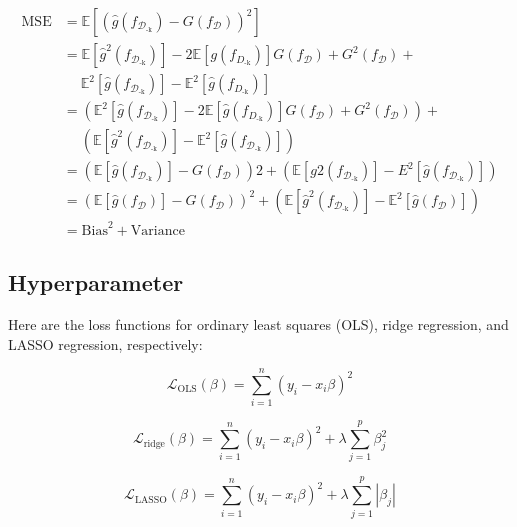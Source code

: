 \begin{equation} \label{eq_mse}
    \begin{split}
        \mathrm{MSE}&=\mathbb{E}[(\hat{g}(f_{\mathcal{D}_{\text{-k}}})-G(f_\mathcal{D}))^2]\\
        &=\mathbb{E}[{\hat{g}}^2(f_{\mathcal{D}_{\text{-k}}})] - 2\mathbb{E}[g(f_{D_\text{-k}})]G(f_\mathcal{D})+G^2(f_\mathcal{D}) +\\
        &\quad \; \mathbb{E}^2[\hat{g}(f_{\mathcal{D}_{\text{-k}}})] - \mathbb{E}^2[\hat{g}(f_{D_\text{-k}})]\\
        &=(\mathbb{E}^2[\hat{g}(f_{\mathcal{D}_{\text{-k}}})] - 2\mathbb{E}[\hat{g}(f_{D_\text{-k}})]G(f_{\mathcal{D}}) + G^{2}(f_{\mathcal{D}})) +\\
        &\quad \; (\mathbb{E}[{\hat{g}}^2(f_{\mathcal{D}_{\text{-k}}})]-\mathbb{E}^2[\hat{g}(f_{\mathcal{D}_{\text{-k}}})])\\
        &=(\mathbb{E}[\hat{g}(f_{\mathcal{D}_{\text{-k}}})]-G(f_{\mathcal{D}}))2+(\mathbb{E}[g2(f_{\mathcal{D}_{\text{-k}}})]-E^2[\hat{g}(f_{\mathcal{D}_{\text{-k}}})])\\
        &=(\mathbb{E}[\hat{g}(f_\mathcal{D})] - G(f_{\mathcal{D}}))^{2} +(\mathbb{E}[\hat{g}^2(f_{\mathcal{D}_{\text{-k}}})]-\mathbb{E}^2[\hat{g}(f_{\mathcal{D}})])\\
        &={\mathrm{Bias}}^2+\mathrm{Variance}
    \end{split}
\end{equation}

\subsection*{Hyperparameter}

Here are the loss functions for ordinary least squares (OLS), ridge regression, and LASSO regression, respectively:


\begin{equation} \label{eq_ols}
    \mathcal{L}_\text{OLS}(\beta)=\sum_{i=1}^{n}(y_i-x_i\beta)^2
\end{equation}

\begin{equation} \label{eq_ridge}
    \mathcal{L}_\text{ridge}(\beta)=\sum_{i=1}^{n}(y_i-x_i\beta)^2+\lambda\sum_{j=1}^{p}\beta_{j}^2
\end{equation}

\begin{equation} \label{eq_lasso}
    \mathcal{L}_\text{LASSO}(\beta)=\sum_{i=1}^{n}(y_i-x_i\beta)^2+\lambda\sum_{j=1}^{p}|\beta_j|
\end{equation}

